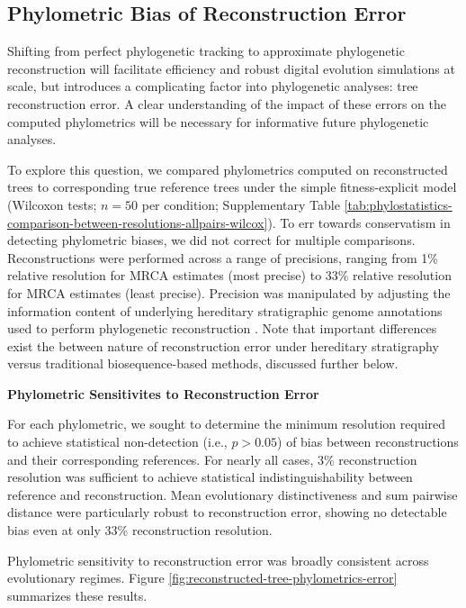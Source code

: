 \subsection{Phylometric Bias of Reconstruction Error}
\label{sec:phylometric-bias-reconstruction-error}

Shifting from perfect phylogenetic tracking to approximate phylogenetic reconstruction will facilitate efficiency and robust digital evolution simulations at scale, but introduces a complicating factor into phylogenetic analyses: tree reconstruction error.
A clear understanding of the impact of these errors on the computed phylometrics will be necessary for informative future phylogenetic analyses.

To explore this question, we compared phylometrics computed on reconstructed trees to corresponding true reference trees under the simple fitness-explicit model (Wilcoxon tests; $n=50$ per condition; Supplementary Table \ref{tab:phylostatistics-comparison-between-resolutions-allpairs-wilcox}).
To err towards conservatism in detecting phylometric biases, we did not correct for multiple comparisons.
Reconstructions were performed across a range of precisions, ranging from 1\% relative resolution for MRCA estimates (most precise) to 33\% relative resolution for MRCA estimates (least precise).
Precision was manipulated by adjusting the information content of underlying hereditary stratigraphic genome annotations used to perform phylogenetic reconstruction \citep{moreno2022hereditary}.
Note that important differences exist the between nature of reconstruction error under hereditary stratigraphy versus traditional biosequence-based methods, discussed further below.

\textbf{Phylometric Sensitivites to Reconstruction Error}



For each phylometric, we sought to determine the minimum resolution required to achieve statistical non-detection (i.e., $p > 0.05$) of bias between reconstructions and their corresponding references.
For nearly all cases, 3\% reconstruction resolution was sufficient to achieve statistical indistinguishability between reference and reconstruction.
Mean evolutionary distinctiveness and sum pairwise distance were particularly robust to reconstruction error, showing no detectable bias even at only 33\% reconstruction resolution.

Phylometric sensitivity to reconstruction error was broadly consistent across evolutionary regimes.
Figure \ref{fig:reconstructed-tree-phylometrics-error} summarizes these results.

